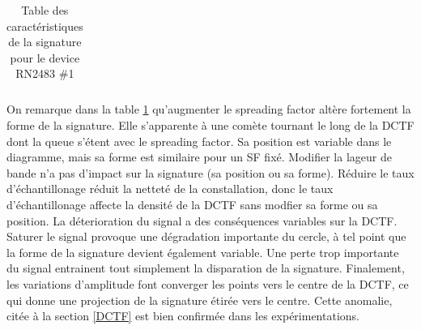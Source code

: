 \begin{table}[h]
\begin{tabular}{|c|c|c|c|c|}
\hline
\end{tabular}
\caption{Table des caractéristiques de la signature pour le device RN2483 \#1}
\label{signature1}
\end{table}

On remarque dans la table \ref{signature1} qu'augmenter le spreading factor altère fortement la forme de la signature. Elle s'apparente à une comète tournant le long de la \ac{DCTF} dont la queue s'étent avec le spreading factor. Sa position est variable dans le diagramme, mais sa forme est similaire pour un SF fixé. Modifier la lageur de bande n'a pas d'impact sur la signature (sa position ou sa forme). Réduire le taux d'échantillonage réduit la netteté de la constallation, donc le taux d'échantillonage affecte la densité de la \ac{DCTF} sans modfier sa forme ou sa position. La déterioration du signal a des conséquences variables sur la \ac{DCTF}. Saturer le signal provoque une dégradation importante du cercle, à tel point que la forme de la signature devient également variable. Une perte trop importante du signal entrainent tout simplement la disparation de la signature. Finalement, les variations d'amplitude font converger les points vers le centre de la \ac{DCTF}, ce qui donne une projection de la signature étirée vers le centre. Cette anomalie, citée à la section \ref{DCTF} est bien confirmée dans les expérimentations.

